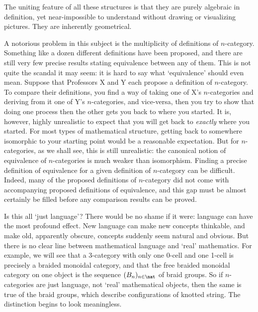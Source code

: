 The uniting feature of all these structures is that they are purely
algebraic in definition, yet near-impossible to understand without drawing
or visualizing pictures.  They are inherently geometrical.  

A notorious problem in this subject is the multiplicity of definitions of
$n$-category.%
%
%
 Something like a dozen different definitions have been
proposed, and there are still very few precise results stating equivalence
between any of them.  This is not quite the scandal it may seem: it is hard to
say what `equivalence'%
%
%
should even mean.  Suppose that Professors X and Y
each propose a definition of $n$-category.  To compare their definitions,
you find a way of taking one of X's $n$-categories and deriving from it
one of Y's $n$-categories, and vice-versa, then you try to show that
doing one process then the other gets you back to where you started.  It
is, however, highly unrealistic to expect that you will get back to
\emph{exactly} where you started.  For most types of mathematical
structure, getting back to somewhere isomorphic to your starting point
would be a reasonable expectation.  But for $n$-categories, as we shall
see, this is still unrealistic: the canonical notion of equivalence%
%
%
of
$n$-categories is much weaker than isomorphism.  Finding a precise
definition of equivalence for a given definition of $n$-category can be
difficult.  Indeed, many of the proposed definitions of $n$-category did
not come with accompanying proposed definitions of equivalence, and this
gap must be almost certainly be filled before any comparison results can be
proved.


Is this all `just language'?  There would be no shame if it were: language
can have the most profound effect.  New language can make new concepts
thinkable, and make old, apparently obscure, concepts suddenly seem natural
and obvious.  But there is no clear line between mathematical language and
`real' mathematics.  For example, we will see that a 3-category%
%
%
with only
one 0-cell and one 1-cell is precisely a braided monoidal category,%
%
%
and
that the free braided monoidal category on one object is the sequence
$(B_n)_{n\in\nat}$ of braid%
%
%
groups.  So if $n$-categories are just
language, not `real' mathematical objects, then the same is true of the
braid groups, which describe configurations of knotted string.  The
distinction begins to look meaningless.


